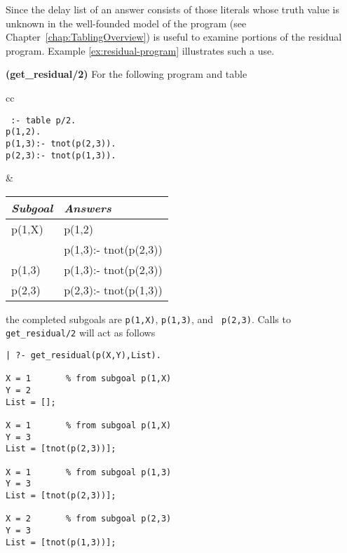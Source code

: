 \begin{description}
 Since the delay list of an answer consists of
those literals whose truth value is unknown in the well-founded model
of the program (see Chapter~\ref{chap:TablingOverview})
 is useful to examine portions of the residual
program.  Example \ref{ex:residual-program} illustrates such a use.

\begin{example}{{\bf (get\_residual/2)}} \label{ex:residual-program}
For the following program and table
     \begin{center}
     \begin{tabular}{cc}
     \begin{minipage}{2.1in}
     {\tt
          :- table p/2. \\
          p(1,2). \\
          p(1,3):- tnot(p(2,3)). \\
          p(2,3):- tnot(p(1,3)). 
     }
     \end{minipage}
     &
     \begin{tabular}{||l|l||}   \hline
     {\em Subgoal}                 & {\em Answers} \\ \hline \hline
     p(1,X)                     & p(1,2) \\ 
                                & p(1,3):- tnot(p(2,3)) \\ \hline
     p(1,3)                     & p(1,3):- tnot(p(2,3)) \\ \hline
     p(2,3)                     & p(2,3):- tnot(p(1,3)) \\ \hline
     \end{tabular}
     \end{tabular}
     \end{center}
the completed subgoals are {\tt p(1,X)}, {\tt p(1,3)}, and {\tt
p(2,3)}.  Calls to {\tt get\_residual/2} will act as follows
%
\begin{center}
\begin{small}
\begin{verbatim} 
| ?- get_residual(p(X,Y),List).

X = 1       % from subgoal p(1,X)
Y = 2
List = [];

X = 1       % from subgoal p(1,X)
Y = 3
List = [tnot(p(2,3))];

X = 1       % from subgoal p(1,3)
Y = 3
List = [tnot(p(2,3))];

X = 2       % from subgoal p(2,3)
Y = 3
List = [tnot(p(1,3))];


\end{verbatim}
\end{small}
\end{center}
\end{example}
\end{description}
